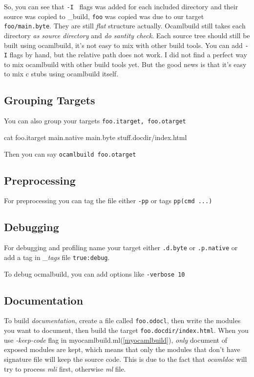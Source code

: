 
So, you can see that \verb|-I | flags was added for each included
directory and their source was copied to \_build, \verb|foo| was
copied was due to our target \verb|foo/main.byte|. They are still
\textit{flat} structure actually. Ocamlbuild still takes each
directory \textit{as source directory} and \textit{do santity
  check}. Each source tree should still be built using ocamlbuild,
it's not easy to mix with other build tools. You can add \verb|-I|
flags by hand, but the relative path does not work. I did not find a
perfect way to mix ocamlbuild with other build tools yet. But the good
news is that it's easy to mix c stubs using ocamlbuild itself.


\subsection{Grouping Targets}
You can also  group your targets \verb|foo.itarget, foo.otarget|

\begin{bashcode}
cat foo.itarget
main.native
main.byte 
stuff.docdir/index.html    
\end{bashcode}
Then you can say \verb|ocamlbuild foo.otarget|

\subsection{Preprocessing}
For preprocessing you can tag the file either \verb|-pp| or tags \verb|pp(cmd ...)| 

\subsection{Debugging}
For debugging and profiling name your target either \verb|.d.byte| or
\verb|.p.native| or add a tag in \textit{\_tags} file
\verb|true:debug|.

To debug ocmalbuild, you can add options like \verb|-verbose 10|
\subsection{Documentation}
\label{documentation}

To build \textit{documentation}, create a file called \verb|foo.odocl|, then
write the modules you want to document, then build the target
\verb|foo.docdir/index.html|. When you use \textit{-keep-code} flag in
myocamlbuild.ml(\ref{myocamlbuild}), \textit{only} document of exposed
modules are kept, which means that only the modules that don't have
signature file will keep the source code. This is due to the fact that
\textit{ocamldoc} will try to process \textit{mli} first, otherwise
\textit{ml} file.

